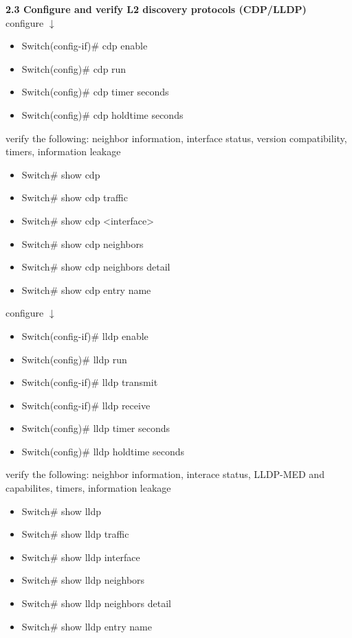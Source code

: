 \documentclass{article}
\begin{document}
\textbf{2.3 Configure and verify L2 discovery protocols (CDP/LLDP)}\\

configure $\downarrow$
\begin{itemize}
\item Switch(config-if)\# cdp enable
\item Switch(config)\# cdp run
\item Switch(config)\# cdp timer seconds
\item Switch(config)\# cdp holdtime seconds
\end{itemize}
		
verify the following: neighbor information, interface status, version compatibility, timers, information leakage
\begin{itemize}
\item Switch\# show cdp
\item Switch\# show cdp traffic
\item Switch\# show cdp \textless interface\textgreater
\item Switch\# show cdp neighbors
\item Switch\# show cdp neighbors detail
\item Switch\# show cdp entry name
\end{itemize}
		
configure $\downarrow$
\begin{itemize}
\item Switch(config-if)\# lldp enable
\item Switch(config)\# lldp run
\item Switch(config-if)\# lldp transmit
\item Switch(config-if)\# lldp receive
\item Switch(config)\# lldp timer seconds
\item Switch(config)\# lldp holdtime seconds
\end{itemize}
		
verify the following: neighbor information, interace status, LLDP-MED and capabilites, timers, information leakage
\begin{itemize}
\item Switch\# show lldp
\item Switch\# show lldp traffic
\item Switch\# show lldp interface
\item Switch\# show lldp neighbors
\item Switch\# show lldp neighbors detail
\item Switch\# show lldp entry name
\end{itemize}
  		
\end{document}
